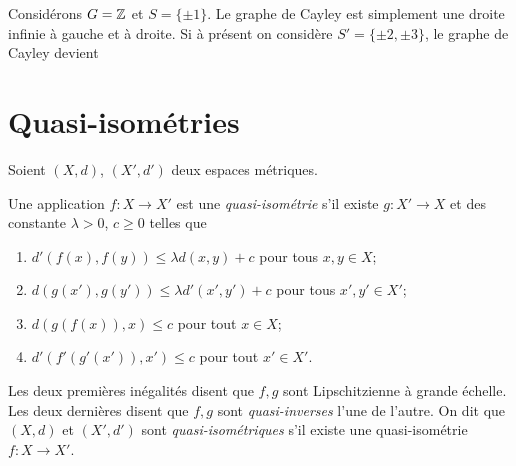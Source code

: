   \begin{ex}
    Considérons $G = \mathbb{Z}$ et $S = \{\pm 1\}$. Le graphe de Cayley est simplement une droite infinie à gauche et
    à droite. Si à présent on considère $S' = \{\pm 2, \pm 3\}$, le graphe de Cayley devient 
    \begin{center}
    

          \end{center}
  \end{ex}



  \section{Quasi-isométries}
  \label{sec:quasi-isometries}

  
  Soient $(X, d)$, $(X', d')$ deux espaces métriques.

  \begin{defi}
    Une application $f: X \to X'$ est une \emph{quasi-isométrie}  s'il existe $g: X' \to
    X$ et des constante $\lambda >0$, $c \geq 0$ telles que
    \begin{enumerate}
    \item $d'(f(x), f(y)) \leq \lambda d(x,y) + c$ pour tous $x, y \in X$;
    \item $d(g(x'), g(y')) \leq \lambda d'(x', y') + c$ pour tous $x', y' \in X'$;
    \item $d(g(f(x)), x) \leq c$ pour tout $x \in X$;
    \item $d'(f'(g'(x')), x') \leq c$ pour tout $x' \in X'$.
    \end{enumerate}
    Les deux premières inégalités disent que $f, g$ sont Lipschitzienne à grande échelle. Les deux dernières
    disent que $f, g$ sont \emph{quasi-inverses}  l'une de l'autre.
    On dit que $(X, d)$ et $(X', d')$ sont \emph{quasi-isométriques}  s'il
    existe une quasi-isométrie $f: X \to X'$.
  \end{defi}


